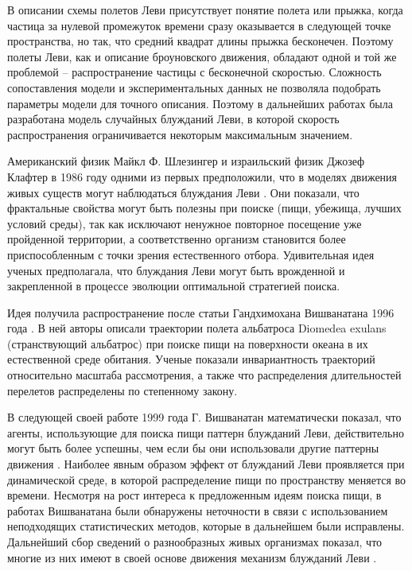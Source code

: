 В описании схемы полетов Леви присутствует понятие полета или прыжка, когда частица за нулевой промежуток времени сразу оказывается в следующей точке пространства, но так, что средний квадрат длины прыжка бесконечен. Поэтому полеты Леви, как и описание броуновского движения, обладают одной и той же проблемой -- распространение частицы с бесконечной скоростью. Сложность сопоставления модели и экспериментальных данных не позволяла подобрать параметры модели для точного описания. Поэтому в дальнейших работах была разработана модель случайных блужданий Леви, в которой скорость распространения ограничивается некоторым максимальным значением. 

Американский физик Майкл Ф. Шлезингер и израильский физик Джозеф Клафтер в 1986 году одними из первых предположили, что в моделях движения живых существ могут наблюдаться блуждания Леви \cite{shlesinger_levy_1986}. Они показали, что фрактальные свойства могут быть полезны при поиске (пищи, убежища, лучших условий среды), так как исключают ненужное повторное посещение уже пройденной территории, а соответственно организм становится более приспособленным с точки зрения естественного отбора. Удивительная идея ученых предполагала, что блуждания Леви могут быть врожденной и закрепленной в процессе эволюции оптимальной стратегией поиска.

Идея получила распространение после статьи Гандхимохана Вишванатана 1996 года \cite{viswanathan_levy_1996}. В ней авторы описали траектории полета альбатроса Diomedea exulans (странствующий альбатрос) при поиске пищи на поверхности океана в их естественной среде обитания. Ученые показали инвариантность траекторий относительно масштаба рассмотрения, а также что распределения длительностей перелетов распределены по степенному закону. 

В следующей своей работе 1999 года Г. Вишванатан математически показал, что агенты, использующие для поиска пищи паттерн блужданий Леви, действительно могут быть более успешны, чем если бы они использовали другие паттерны движения \cite{viswanathan_optimizing_1999}. Наиболее явным образом эффект от блужданий Леви проявляется при динамической среде, в которой распределение пищи по пространству меняется во времени. Несмотря на рост интереса к предложенным идеям поиска пищи, в работах Вишванатана были обнаружены неточности в связи с использованием неподходящих статистических методов, которые в дальнейшем были исправлены. Дальнейший сбор сведений о разнообразных живых организмах показал, что многие из них имеют в своей основе движения механизм блужданий Леви \cite{zaburdaev_levy_2015}.

